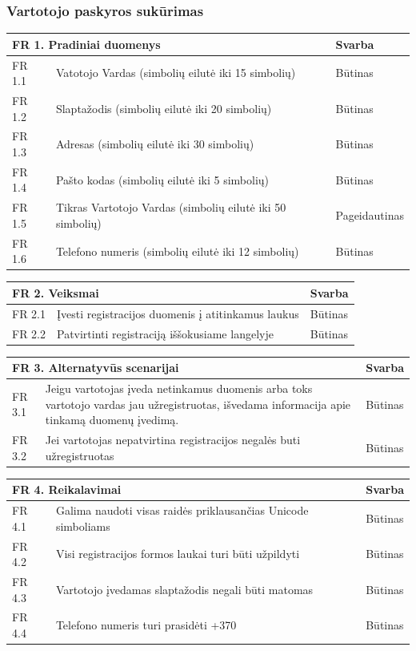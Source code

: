 \documentclass{VUMIFPSkursinis}
\begin{document}
\subsubsection{Vartotojo paskyros sukūrimas }
\noindent
 \vspace{5mm}
  \begin{tabular}{ | p{} | p{} | p{} |}
    \hline
   \multicolumn{2}{|l|}{FR 1. Pradiniai duomenys} &Svarba  \\ \hline 
   FR 1.1 & Vatotojo Vardas (simbolių eilutė iki 15 simbolių) & Būtinas\\ \hline
    FR 1.2& Slaptažodis (simbolių eilutė iki 20 simbolių) &Būtinas \\ \hline
    FR 1.3  & Adresas (simbolių eilutė iki 30 simbolių)  &Būtinas\\
\hline
 FR 1.4 &  Pašto kodas (simbolių eilutė iki 5 simbolių) &  Būtinas\\   \hline
 FR 1.5 &  Tikras Vartotojo Vardas (simbolių eilutė iki 50 simbolių) &  Pageidautinas\\   \hline 
 FR 1.6 &  Telefono numeris (simbolių eilutė iki 12 simbolių) &  Būtinas\\   \hline
    \end{tabular}
 \vspace{5mm}
  \begin{tabular}{ | p{} | p{} | p{} |}
    \hline
   \multicolumn{2}{|l|}{FR 2. Veiksmai} &Svarba  \\ \hline 
  FR 2.1 &Įvesti registracijos duomenis į atitinkamus laukus & Būtinas\\ \hline
    FR 2.2& Patvirtinti registraciją iššokusiame langelyje &Būtinas \\ \hline
    \end{tabular} 
\vspace{5mm}
  \begin{tabular}{ | p{} | p{} | p{} |}
    \hline
   \multicolumn{2}{|l|}{FR 3. Alternatyvūs scenarijai} &Svarba  \\ \hline 
  FR 3.1 &Jeigu vartotojas įveda netinkamus duomenis arba toks vartotojo vardas jau užregistruotas, išvedama informacija apie tinkamą duomenų įvedimą. & Būtinas\\ \hline
     FR 3.2&  Jei vartotojas nepatvirtina registracijos negalės buti užregistruotas&Būtinas \\ \hline
    \end{tabular}
 \vspace{5mm}
  \begin{tabular}{ | p{} | p{} | p{} |}
    \hline
   \multicolumn{2}{|l|}{ FR 4. Reikalavimai} &Svarba  \\ \hline 
   FR 4.1 &  Galima naudoti visas raidės priklausančias Unicode simboliams & Būtinas\\ \hline
    FR 4.2& Visi registracijos formos laukai turi būti užpildyti &Būtinas \\ \hline
    FR 4.3 &  Vartotojo įvedamas slaptažodis negali būti matomas &  Būtinas\\
    \hline
    FR 4.4  & Telefono numeris turi prasidėti +370  &Būtinas\\
    \hline
    \end{tabular}
\end{document}

